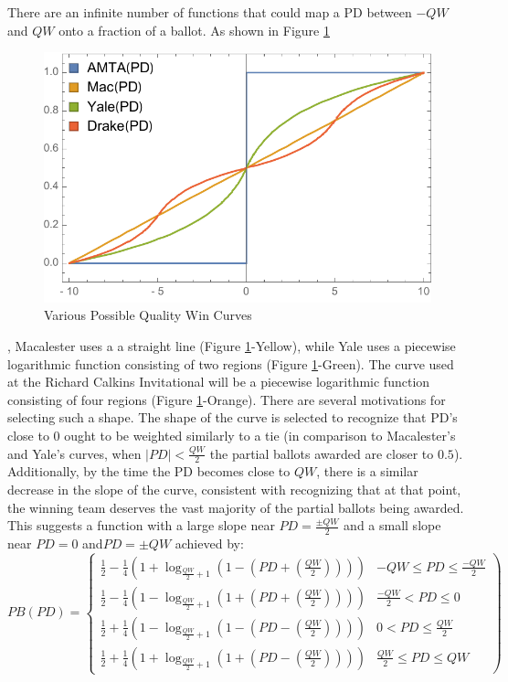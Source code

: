 \documentclass{article}
\begin{document}
There are an infinite number of functions that could map a PD between $-QW$ and $QW$ onto a fraction of a ballot.  As shown in Figure \ref{ballotCurves}
\begin{figure}[h]
\centering
\caption{Various Possible Quality Win Curves}
\label{ballotCurves}
\includegraphics[width=0.8\linewidth]{BallotCurve}
\end{figure}
, Macalester uses a a straight line (Figure \ref{ballotCurves}-Yellow), while Yale uses a piecewise logarithmic function consisting of two regions (Figure \ref{ballotCurves}-Green).  The curve used at the Richard Calkins Invitational will be a piecewise logarithmic function consisting of four regions (Figure \ref{ballotCurves}-Orange).  There are several motivations for selecting such a shape.  The shape of the curve is selected to recognize that PD's close to 0 ought to be weighted similarly to a tie (in comparison to Macalester's and Yale's curves, when $|PD|<\frac{QW}{2}$ the partial ballots awarded are closer to $0.5$).  Additionally, by the time the PD becomes close to $QW$, there is a similar decrease in the slope of the curve, consistent with recognizing that at that point, the winning team deserves the vast majority of the partial ballots being awarded.  This suggests a function with a large slope near $PD=\frac{\pm QW}{2}$ and a small slope near $PD=0$ and$PD=\pm QW$ achieved by:\\
\begin{displaymath}
   PB(PD) = \left\{
     \begin{array}{lr}
       \frac{1}{2}-\frac{1}{4}\left(1+\log_{\frac{QW}{2}+1}\left(1-\left(PD+\left(\frac{QW}{2}\right)\right)\right)\right) &  -QW\le PD\le \frac{-QW}{2}\\
       \frac{1}{2}-\frac{1}{4}\left(1-\log_{\frac{QW}{2}+1}\left(1+\left(PD+\left(\frac{QW}{2}\right)\right)\right)\right) &  \frac{-QW}{2}<PD\le 0\\
       \frac{1}{2}+\frac{1}{4}\left(1-\log_{\frac{QW}{2}+1}\left(1-\left(PD-\left(\frac{QW}{2}\right)\right)\right)\right) &  0<PD\le\frac{QW}{2}\\
       \frac{1}{2}+\frac{1}{4}\left(1+\log_{\frac{QW}{2}+1}\left(1+\left(PD-\left(\frac{QW}{2}\right)\right)\right)\right) & \frac{QW}{2}\le PD \le QW
     \end{array}
  \right)
\end{displaymath}
\end{document}
